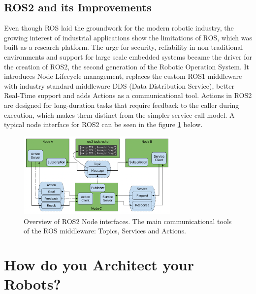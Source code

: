 \documentclass[%
paper=A4,               %
twoside=true,           %
openright,              %
11pt,                   %
bibliography=totoc,     %
titlepage=on,           %
DIV=12,                 %
BCOR=1.5cm,             %
parskip=half,            %
final
]{scrreprt}
\begin{document}
	\subsection{ROS2 and its Improvements}
	
	
	Even though ROS laid the groundwork for the modern robotic industry, the growing interest of industrial applications show the limitations of ROS, which was built as a research platform. The urge for security, reliability in non-traditional environments and support for large scale embedded systems became the driver for the creation of ROS2, the second generation of the Robotic Operation System. \autocite{macenskiRobotOperatingSystem2022} 
	It introduces Node Lifecycle management, replaces the custom ROS1 middleware with industry standard middleware DDS (Data Distribution Service), better Real-Time support and adds Actions as a communicational tool. Actions in ROS2 are designed for long-duration tasks that require feedback to the caller during execution, which makes them distinct from the simpler service-call model.  \autocite{macenskiRobotOperatingSystem2022} A typical node interface for ROS2 can be seen in the figure \ref{fig: fig5} below. 
	
	\begin{figure}[ht]
		\centering
		\includegraphics[width=0.7\textwidth]{Graphics/ROS2}
		\caption{Overview of ROS2 Node interfaces. The main communicational tools of the ROS middleware: Topics, Services and Actions. \autocite{macenskiRobotOperatingSystem2022}}
		\label{fig: fig5}
	\end{figure}
	
	\newpage
	
	\section{How do you Architect your Robots?}
\end{document}
